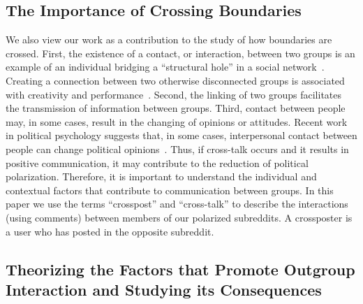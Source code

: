 \documentclass[letterpaper]{article}
\newcommand{\fabio}[1]{{\textcolor{blue}{fabio: #1}}}
\newcommand{\yy}[1]{{\textcolor{green}{yy: #1}}}
\newcommand{\pat}[1]{{\textcolor{red}{Pat: #1}}}
\begin{document}


\subsection{The Importance of Crossing Boundaries}
We also view our work as a contribution to the study of how boundaries are crossed. First, the existence of a contact, or interaction, between two groups is an example of an individual bridging a ``structural hole'' in a social network~\cite{burt2004structuralholes,burt2007burtbrokerage}. Creating a connection between two otherwise disconnected groups is associated with creativity and performance~\cite{burt2004structuralholes,burt2007burtbrokerage}. Second, the linking of two groups facilitates the transmission of information between groups. Third, contact between people may, in some cases, result in the changing of opinions or attitudes. Recent work in political psychology suggests that, in some cases, interpersonal contact between people can change political opinions~\cite{broockman2016reducingtransphobia}. Thus, if cross-talk occurs and it results in positive communication, it may contribute to the reduction of political polarization. Therefore, it is important to understand the individual and contextual factors that contribute to communication between groups. In this paper we use the terms ``crosspost'' and ``cross-talk'' to describe the interactions (using comments) between members of our polarized subreddits. A crossposter is a user who has posted in the opposite subreddit.


\subsection{Theorizing the Factors that Promote Outgroup Interaction and Studying its Consequences}
\end{document}
